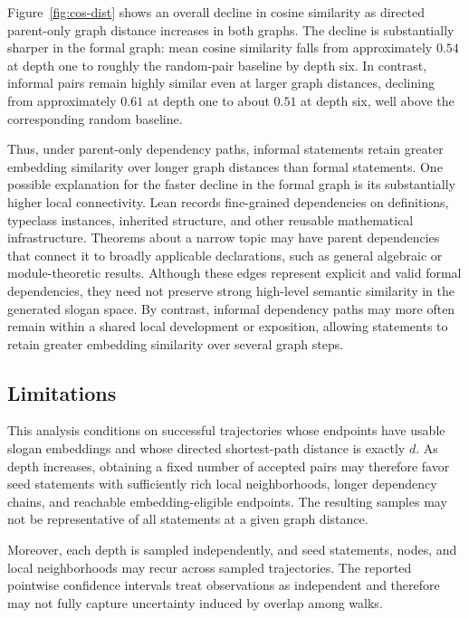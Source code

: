 Figure~\ref{fig:cos-dist} shows an overall decline in cosine similarity as
directed parent-only graph distance increases in both graphs. The decline is substantially sharper in the formal graph: mean cosine similarity falls from approximately $0.54$ at depth one to roughly the random-pair baseline by depth six. In contrast, informal pairs remain highly similar even at larger graph distances, declining from approximately $0.61$ at depth one to about $0.51$ at depth six, well above the corresponding random baseline.

Thus, under parent-only dependency paths, informal statements retain greater embedding similarity over longer graph distances than formal statements. One possible explanation for the faster decline in the formal graph is its substantially higher local connectivity. Lean records fine-grained dependencies on definitions, typeclass instances, inherited structure, and other reusable mathematical infrastructure. Theorems about a narrow topic may have parent dependencies that connect it to broadly applicable declarations, such as general algebraic or module-theoretic results. Although these edges represent explicit and valid formal dependencies, they need not preserve strong high-level semantic similarity in the generated slogan space. By contrast, informal dependency paths may more often remain within a shared local development or exposition, allowing statements to retain greater embedding similarity over several graph steps.

\subsection{Limitations}

This analysis conditions on successful trajectories whose endpoints have usable slogan embeddings and whose directed shortest-path distance is exactly $d$. As depth increases, obtaining a fixed number of accepted pairs may therefore favor seed statements with sufficiently rich local neighborhoods, longer dependency chains, and reachable embedding-eligible endpoints. The resulting samples may not be representative of all statements at a given graph distance.

Moreover, each depth is sampled independently, and seed statements, nodes, and local neighborhoods may recur across sampled trajectories. The reported pointwise confidence intervals treat observations as independent and therefore may not fully capture uncertainty induced by overlap among walks.